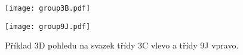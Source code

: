 \begin{figure}[htps]
\centering
\begin{minipage}[c]{0.325\textwidth}
\texttt{[image: group3B.pdf]}
\end{minipage}
\begin{minipage}[c]{0.325\textwidth}
\texttt{[image: group9J.pdf]}
\end{minipage}
\caption{Příklad 3D pohledu na svazek třídy 3C vlevo a třídy 9J vpravo.}
\label{fig:modelClass3D1}
\end{figure}

\clearpage






